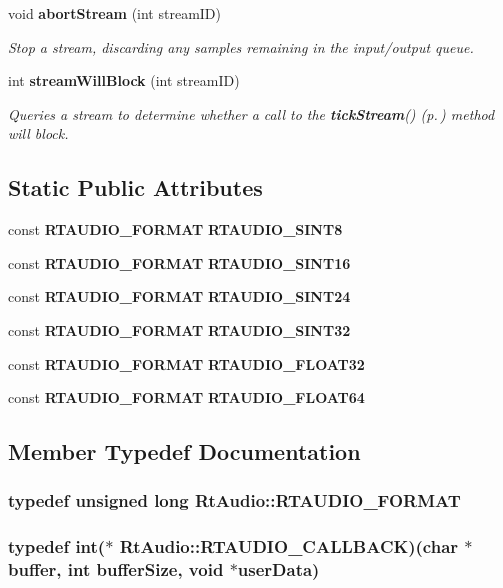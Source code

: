 \begin{CompactItemize}
void {\bf abort\-Stream} (int stream\-ID)
\begin{CompactList}\small\item\em Stop a stream, discarding any samples remaining in the input/output queue.\item\end{CompactList}\item 
int {\bf stream\-Will\-Block} (int stream\-ID)
\begin{CompactList}\small\item\em Queries a stream to determine whether a call to the {\bf tick\-Stream}() {\rm (p.\,\pageref{classRtAudio_a9})} method will block.\item\end{CompactList}\end{CompactItemize}
\subsection*{Static Public Attributes}
\begin{CompactItemize}
\item 
const {\bf RTAUDIO\_\-FORMAT} {\bf RTAUDIO\_\-SINT8}
\item 
const {\bf RTAUDIO\_\-FORMAT} {\bf RTAUDIO\_\-SINT16}
\item 
const {\bf RTAUDIO\_\-FORMAT} {\bf RTAUDIO\_\-SINT24}
\item 
const {\bf RTAUDIO\_\-FORMAT} {\bf RTAUDIO\_\-SINT32}
\item 
const {\bf RTAUDIO\_\-FORMAT} {\bf RTAUDIO\_\-FLOAT32}
\item 
const {\bf RTAUDIO\_\-FORMAT} {\bf RTAUDIO\_\-FLOAT64}
\end{CompactItemize}


\subsection{Member Typedef Documentation}
\subsubsection{\setlength{\rightskip}{0pt plus 5cm}typedef unsigned long Rt\-Audio::RTAUDIO\_\-FORMAT}\label{classRtAudio_s0}


\subsubsection{\setlength{\rightskip}{0pt plus 5cm}typedef int($\ast$ Rt\-Audio::RTAUDIO\_\-CALLBACK)(char $\ast$buffer, int buffer\-Size, void $\ast$user\-Data)}\label{classRtAudio_s1}




